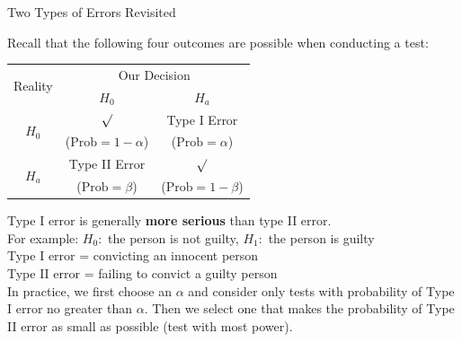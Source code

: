 \documentclass{beamer}\usepackage[]{graphicx}\usepackage[]{color}
\begin{document}
\begin{frame}{Two Types of Errors Revisited}

    Recall that the following four outcomes are possible when conducting
    a test:

    \begin{center}
      \begin{tabular}{|c|c|c|}
        \hline
        \multirow{2}{*}{Reality} & \multicolumn{2}{c|}{Our Decision}\\
        & \multicolumn{1}{c}{$H_0$} & $H_a$\\
        \hline
        \multirow{2}{*}{$H_0$} & $\surd$ & Type I Error\\
        & ($\mbox{Prob}=1-\alpha$) & ($\mbox{Prob}=\alpha$)\\
        \cline{2-3}
        \multirow{2}{*}{$H_a$} & Type II Error & $\surd$\\
        & ($\mbox{Prob}=\beta$) & ($\mbox{Prob}=1-\beta$)\\
        \hline
      \end{tabular}
    \end{center}
\pause
    Type I error is generally {\bf more serious} than type II error. \\ \pause
    For example: $H_0:$ the person is not guilty, $H_1:$ the person is guilty\\ \pause
    Type I error \pause = convicting an innocent person\\ \pause
    Type II error \pause = failing to convict a guilty person\\ \pause  
\medskip
    In practice, we first choose an $\alpha$ and consider only tests
    with probability of Type I error no greater than $\alpha$. \pause Then we select one that makes the probability
    of Type II error as small as possible (test with most power). \pause

\end{frame}
\end{document}
